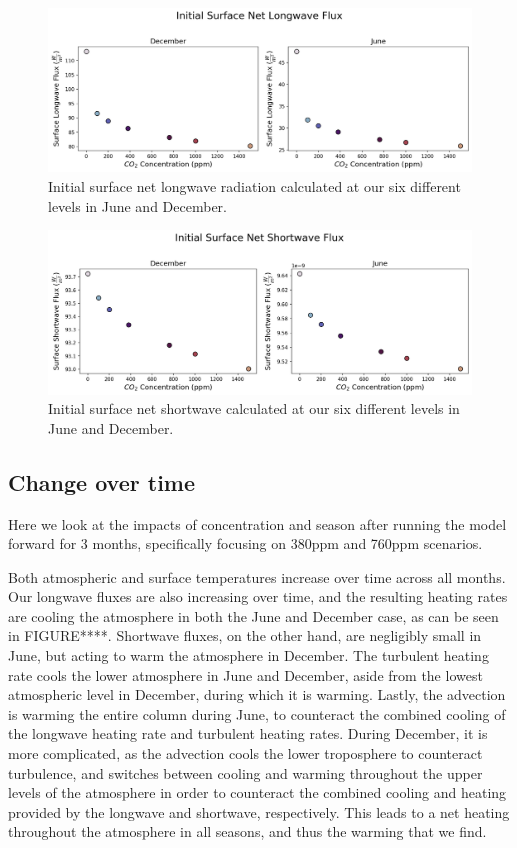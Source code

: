 \documentclass[12]{article}
\begin{document}
\begin{figure}[htb!]
\noindent\includegraphics[width=1\textwidth]{figures/sfcLW_init.png}
\centering
\caption{Initial surface net longwave radiation calculated at our six different  levels in June and December.}
\label{fig:init_sfc_LW}
\end{figure}

\begin{figure}[htb!]
\noindent\includegraphics[width=1\textwidth]{figures/sfcSW_init.png}
\centering
\caption{Initial surface net shortwave calculated at our six different  levels in June and December.}
\label{fig:init_sfc_SW}
\end{figure}


\subsection{Change over time}
Here we look at the impacts of  concentration and season after running the model forward for 3 months, specifically focusing on 380ppm and 760ppm scenarios. 

Both atmospheric and surface temperatures increase over time across all months. Our longwave fluxes are also increasing over time, and the resulting heating rates are cooling the atmosphere in both the June and December case, as can be seen in FIGURE****. Shortwave fluxes, on the other hand, are negligibly small in June, but acting to warm the atmosphere in December. The turbulent heating rate cools the lower atmosphere in June and December, aside from the lowest atmospheric level in December, during which it is warming. Lastly, the advection is warming the entire column during June, to counteract the combined cooling of the longwave heating rate and turbulent heating rates. During December, it is more complicated, as the advection cools the lower troposphere to counteract turbulence, and switches between cooling and warming throughout the upper levels of the atmosphere in order to counteract the combined cooling and heating provided by the longwave and shortwave, respectively. This leads to a net heating throughout the atmosphere in all seasons, and thus the warming that we find.
\end{document}
